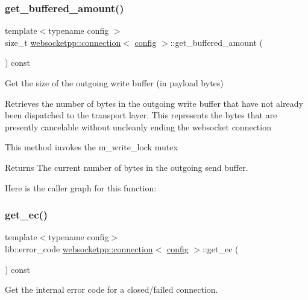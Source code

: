 \subsubsection{\texorpdfstring{get\+\_\+buffered\+\_\+amount()}{get\_buffered\_amount()}}
{\footnotesize\ttfamily template$<$typename config $>$ \\
size\+\_\+t \mbox{\hyperlink{classwebsocketpp_1_1connection}{websocketpp\+::connection}}$<$ \mbox{\hyperlink{classconfig}{config}} $>$\+::get\+\_\+buffered\+\_\+amount (\begin{DoxyParamCaption}{ }\end{DoxyParamCaption}) const}



Get the size of the outgoing write buffer (in payload bytes) 

Retrieves the number of bytes in the outgoing write buffer that have not already been dispatched to the transport layer. This represents the bytes that are presently cancelable without uncleanly ending the websocket connection

This method invokes the m\+\_\+write\+\_\+lock mutex

\begin{DoxyReturn}{Returns}
The current number of bytes in the outgoing send buffer. 
\end{DoxyReturn}
Here is the caller graph for this function\+:
\mbox{\label{classwebsocketpp_1_1connection_a8c05c88d471342673abf0e5ce60aa4cc}} 
\subsubsection{\texorpdfstring{get\+\_\+ec()}{get\_ec()}}
{\footnotesize\ttfamily template$<$typename config$>$ \\
lib\+::error\+\_\+code \mbox{\hyperlink{classwebsocketpp_1_1connection}{websocketpp\+::connection}}$<$ \mbox{\hyperlink{classconfig}{config}} $>$\+::get\+\_\+ec (\begin{DoxyParamCaption}{ }\end{DoxyParamCaption}) const\hspace{0.3cm}{\ttfamily [inline]}}



Get the internal error code for a closed/failed connection. 

